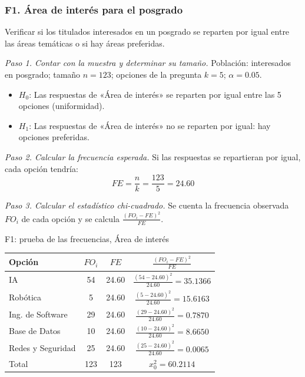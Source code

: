 \subsubsection*{F1. Área de interés para el posgrado}

Verificar si los titulados interesados en un posgrado se reparten por igual entre las áreas temáticas o si hay áreas preferidas.

\textit{Paso 1. Contar con la muestra y determinar su tamaño.} Población: interesados en posgrado; tamaño $n = 123$; opciones de la pregunta $k = 5$; $\alpha = 0.05$.

\begin{itemize}[nosep]
  \item $H_0$: Las respuestas de «Área de interés» se reparten por igual entre las 5 opciones (uniformidad).
  \item $H_1$: Las respuestas de «Área de interés» no se reparten por igual: hay opciones preferidas.
\end{itemize}

\textit{Paso 2. Calcular la frecuencia esperada.} Si las respuestas se repartieran por igual, cada opción tendría:
\[
FE = \frac{n}{k} = \frac{123}{5} = 24.60
\]

\textit{Paso 3. Calcular el estadístico chi-cuadrado.} Se cuenta la frecuencia observada $FO_i$ de cada opción y se calcula $\frac{(FO_i - FE)^2}{FE}$.

\begin{mitabla}{F1: prueba de las frecuencias, Área de interés}
\begin{tabular}{L{6cm}ccc}
\toprule
Opción & $FO_i$ & $FE$ & $\frac{(FO_i-FE)^2}{FE}$ \\
\midrule
IA & 54 & 24.60 & $\frac{(54-24.60)^2}{24.60} = 35.1366$ \\[3pt]
Robótica & 5 & 24.60 & $\frac{(5-24.60)^2}{24.60} = 15.6163$ \\[3pt]
Ing. de Software & 29 & 24.60 & $\frac{(29-24.60)^2}{24.60} = 0.7870$ \\[3pt]
Base de Datos & 10 & 24.60 & $\frac{(10-24.60)^2}{24.60} = 8.6650$ \\[3pt]
Redes y Seguridad & 25 & 24.60 & $\frac{(25-24.60)^2}{24.60} = 0.0065$ \\[3pt]
\midrule
Total & 123 & 123 & $x_0^2 = 60.2114$ \\
\bottomrule
\end{tabular}
\end{mitabla}

